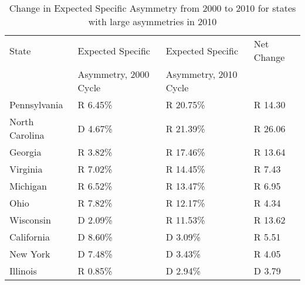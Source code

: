 \begin{table}[htb!]
\centering
\caption{Change in Expected Specific Asymmetry from 2000 to 2010 for states with large asymmetries in 2010 \label{tab:Asym2000to2010}}
\begin{tabular}{|l|l|l|l|}
\hline
State & Expected Specific     & Expected Specific & Net Change\\
      & Asymmetry, 2000 Cycle & Asymmetry, 2010 Cycle & \\
\hline
\hline
Pennsylvania & R 6.45\% & R 20.75\% & R 14.30\\
\hline
North Carolina & D 4.67\% & R 21.39\% & R 26.06\\
\hline
Georgia & R 3.82\% & R 17.46\% & R 13.64\\
\hline
Virginia & R 7.02\% & R 14.45\% & R 7.43\\
\hline
Michigan & R 6.52\% & R 13.47\% & R 6.95\\
\hline
Ohio & R 7.82\% & R 12.17\% & R 4.34\\
\hline
Wisconsin & D 2.09\% & R 11.53\% & R 13.62\\
\hline
California & D 8.60\% & D 3.09\% & R 5.51\\
\hline
New York & D 7.48\% & D 3.43\% & R 4.05\\
\hline
Illinois & R 0.85\% & D 2.94\% & D 3.79\\
\hline
\end{tabular}
\end{table}
